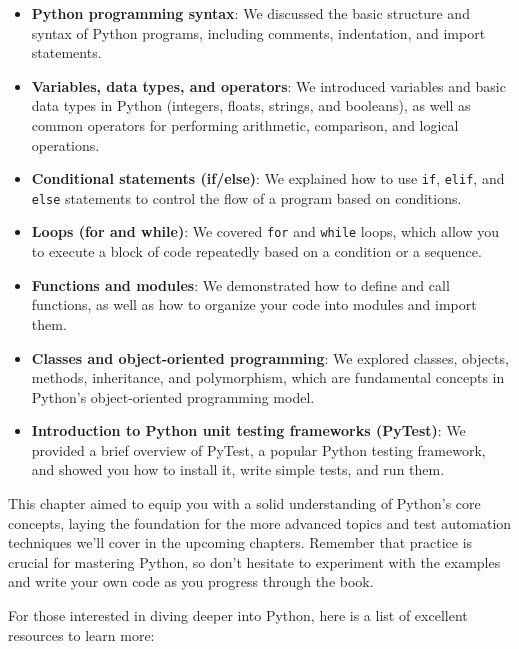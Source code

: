 \documentclass[
  paper=a4,
  ,captions=tableheading
]{scrartcl}
\begin{document}
\begin{itemize}
\item
  \textbf{Python programming syntax}: We discussed the basic structure
  and syntax of Python programs, including comments, indentation, and
  import statements.
\item
  \textbf{Variables, data types, and operators}: We introduced variables
  and basic data types in Python (integers, floats, strings, and
  booleans), as well as common operators for performing arithmetic,
  comparison, and logical operations.
\item
  \textbf{Conditional statements (if/else)}: We explained how to use
  \texttt{if}, \texttt{elif}, and \texttt{else} statements to control
  the flow of a program based on conditions.
\item
  \textbf{Loops (for and while)}: We covered \texttt{for} and
  \texttt{while} loops, which allow you to execute a block of code
  repeatedly based on a condition or a sequence.
\item
  \textbf{Functions and modules}: We demonstrated how to define and call
  functions, as well as how to organize your code into modules and
  import them.
\item
  \textbf{Classes and object-oriented programming}: We explored classes,
  objects, methods, inheritance, and polymorphism, which are fundamental
  concepts in Python's object-oriented programming model.
\item
  \textbf{Introduction to Python unit testing frameworks (PyTest)}: We
  provided a brief overview of PyTest, a popular Python testing
  framework, and showed you how to install it, write simple tests, and
  run them.
\end{itemize}

This chapter aimed to equip you with a solid understanding of Python's
core concepts, laying the foundation for the more advanced topics and
test automation techniques we'll cover in the upcoming chapters.
Remember that practice is crucial for mastering Python, so don't
hesitate to experiment with the examples and write your own code as you
progress through the book.

For those interested in diving deeper into Python, here is a list of
excellent resources to learn more:
\end{document}

